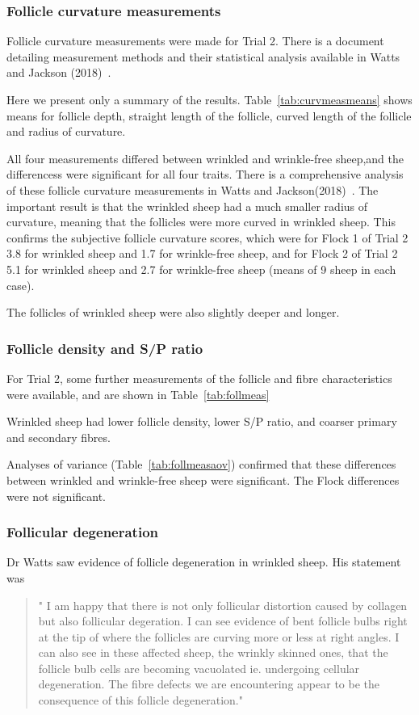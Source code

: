\documentclass[titlepage]{article}  %
\begin{document}
\subsubsection{Follicle curvature measurements}
Follicle curvature measurements were made for Trial 2. There is a document detailing measurement methods and their statistical analysis available in Watts and Jackson (2018)~\cite{watt:18}. 

Here we present only a summary of the results. Table~\ref{tab:curvmeasmeans} shows means for follicle depth, straight length of the follicle, curved length of the follicle and radius of curvature. 

All four measurements differed between wrinkled and wrinkle-free sheep,and the differencess were significant for all four traits.
There is a comprehensive analysis of these follicle curvature measurements in Watts and Jackson(2018)~\cite{watt:18}. 
The important result is that the wrinkled sheep had a much smaller radius of curvature, meaning that the follicles were more curved in wrinkled sheep. This confirms the subjective follicle curvature scores, which were for Flock 1 of Trial 2 3.8 for wrinkled sheep and 1.7 for wrinkle-free sheep, and for Flock 2 of Trial 2 5.1 for wrinkled sheep and 2.7 for wrinkle-free sheep (means of 9 sheep in each case).

 The follicles of wrinkled sheep were also slightly deeper and longer. 

\subsubsection{Follicle density and S/P ratio}
For Trial 2, some further measurements of the follicle and fibre characteristics were available, and are shown in Table~\ref{tab:follmeas}

Wrinkled sheep had lower follicle density, lower S/P ratio, and coarser primary and secondary fibres.

Analyses of variance (Table~\ref{tab:follmeasaov}) confirmed that these differences between wrinkled and wrinkle-free sheep were significant. The Flock differences were not significant.


\subsubsection{Follicular degeneration}
Dr Watts saw evidence of follicle degeneration in wrinkled sheep. His statement was
\begin{quote}
"  I am happy that there is not only follicular distortion caused by collagen but also follicular degeration.  I can see evidence of bent follicle bulbs right at the tip of where the follicles are curving more or less at right angles.  I can also see in these affected sheep, the wrinkly skinned ones, that the follicle bulb cells are becoming vacuolated ie. undergoing cellular degeneration. The fibre defects we are encountering appear to be the consequence of this follicle degeneration."
\end{quote}
\end{document}
